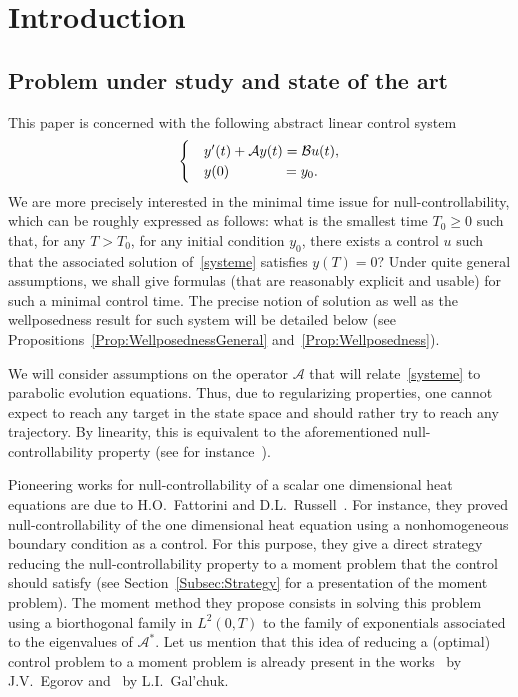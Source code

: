 \documentclass[11pt]{article}
\theoremstyle{definition}
\numberwithin{equation}{section}
\numberwithin{figure}{section}
\numberwithin{table}{section}
\newcommand\A{\mathcal{A}}
\newcommand\As{\mathcal{A}^*}
\newcommand\B{\mathcal{B}}
\begin{document}
\section{Introduction}

\subsection{Problem under study and state of the art}


This paper is concerned with the following abstract linear control system
\begin{equation}\label{systeme}
\begin{cases}
&y'(t) + \A y(t) = \B u(t),
\\
&y(0) \mkern68mu= y_0.
\end{cases}
\end{equation}
We are more precisely interested in the minimal time issue for null-controllability, which can be roughly expressed as follows: what is the smallest time $T_0 \geq0$ such that, for any $T > T_0$, for any initial condition $y_0$, there exists a control $u$ such that the associated solution of~\eqref{systeme} satisfies $y(T)=0$? Under quite general assumptions, we shall give formulas (that are reasonably explicit and usable) for such a minimal control time. The precise notion of solution as well as the wellposedness result for such system will be detailed below (see Propositions~\ref{Prop:WellposednessGeneral} and~\ref{Prop:Wellposedness}).

We will consider assumptions on the operator $\A$ that will relate~\eqref{systeme} to parabolic evolution equations. Thus, due to regularizing properties, one cannot expect to reach any target in the state space and should rather try to reach any trajectory. By linearity, this is equivalent to the aforementioned null-controllability property (see for instance~\cite[Sections.~2.3 and~2.5]{CoronBook}).

Pioneering works for null-controllability of a scalar one dimensional heat equations are due to H.O.~Fattorini and D.L.~Russell~\cite{FattoriniRussell71, FattoriniRussell74}. For instance, they proved null-controllability of the one dimensional heat equation using a nonhomogeneous boundary condition as a control. For this purpose, they give a direct strategy reducing the null-controllability property to a moment problem that the control should satisfy (see Section~\ref{Subsec:Strategy} for a presentation of the moment problem). The moment method they propose consists in solving this problem using a biorthogonal family in $L^2(0,T)$ to the family of exponentials associated to the eigenvalues of $\As$. Let us mention that this idea of reducing a (optimal) control problem to a moment problem is already present in the works~\cite{Egorov63} by J.V.~Egorov and~\cite{Galchuk69} by L.I.~Gal'chuk.
\end{document}
